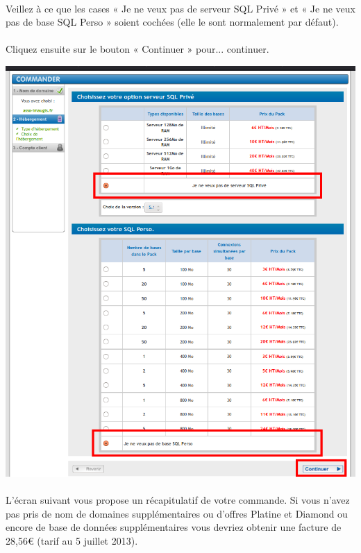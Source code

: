 \documentclass[10pt,a4paper]{article}
\begin{document}
\paragraph{}Veillez à ce que les cases « Je ne veux pas de serveur SQL Privé » et « Je ne veux pas de base SQL Perso » soient cochées (elle le sont normalement par défaut).
\paragraph{}Cliquez ensuite sur le bouton « Continuer » pour... continuer.
\begin{center}
\includegraphics[scale=0.25]{img/0277.png}
\end{center}
\paragraph{}L'écran suivant vous propose un récapitulatif de votre commande. Si vous n'avez pas pris de nom de domaines supplémentaires ou d'offres Platine et Diamond ou encore de base de données supplémentaires vous devriez obtenir une facture de 28,56\euro{} (tarif au 5 juillet 2013).
\end{document}
